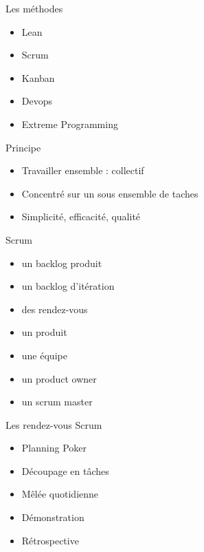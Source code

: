 \documentclass{beamer}
\begin{document}
\begin{frame}{Les méthodes}
  \begin{itemize}
    \item Lean
    \item Scrum
    \item Kanban
    \item Devops
    \item Extreme Programming
  \end{itemize}
\end{frame}

\begin{frame}{Principe}
  \begin{itemize}
    \item Travailler ensemble : collectif
    \item Concentré sur un sous ensemble de taches
    \item Simplicité, efficacité, qualité
  \end{itemize}
\end{frame}

\begin{frame}{Scrum}
  \begin{itemize}
    \item un backlog produit
    \item un backlog d'itération
    \item des rendez-vous
    \item un produit
    \item une équipe
    \item un product owner
    \item un scrum master
  \end{itemize}
\end{frame}

\begin{frame}{Les rendez-vous Scrum}
  \begin{itemize}
    \item Planning Poker
    \item Découpage en tâches
    \item Mêlée quotidienne
    \item Démonstration
    \item Rétrospective
  \end{itemize}
\end{frame}
\end{document}
